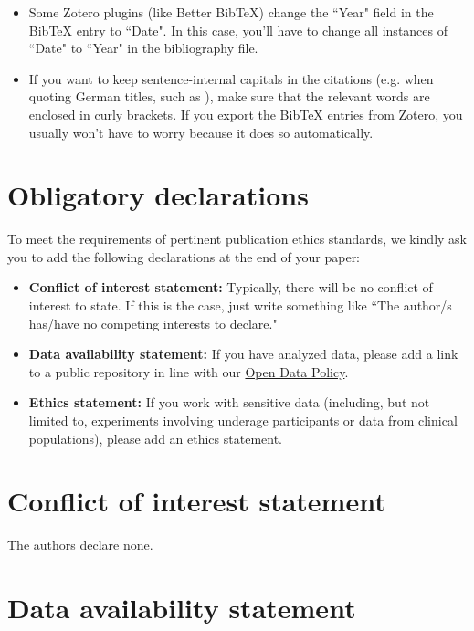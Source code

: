\documentclass[]{constructions}
\begin{document}
\begin{itemize}
    \item Some Zotero plugins (like Better BibTeX) change the ``Year" field in the BibTeX entry to ``Date". In this case, you'll have to change all instances of ``Date" to ``Year" in the bibliography file.
    \item If you want to keep sentence-internal capitals in the citations (e.g. when quoting German titles, such as \citeauthor{Example3} \citeyear{Example3}), make sure that the relevant words are enclosed in curly brackets. If you export the BibTeX entries from Zotero, you usually won't have to worry because it does so automatically.
\end{itemize}

\section*{Obligatory declarations}

To meet the requirements of pertinent publication ethics standards, we kindly ask you to add the following declarations at the end of your paper:

\begin{itemize}
    \item \textbf{Conflict of interest statement:} Typically, there will be no conflict of interest to state. If this is the case, just write something like ``The author/s has/have no competing interests to declare."
    \item \textbf{Data availability statement:} If you have analyzed data, please add a link to a public repository in line with our \href{https://constructions.journals.hhu.de/about}{Open Data Policy}. 
    \item \textbf{Ethics statement:} If you work with sensitive data (including, but not limited to, experiments involving underage participants or data from clinical populations), please add an ethics statement. 

    
\end{itemize}

\section*{Conflict of interest statement}

The authors declare none. %

\section*{Data availability statement}
\end{document}
